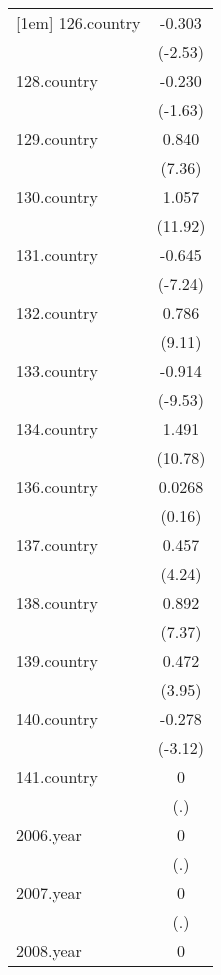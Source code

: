 {\begin{tabular}{l*{1}{c}}
[1em]
126.country &      -0.303\sym{*}  \\
            &     (-2.53)         \\
[1em]
128.country &      -0.230         \\
            &     (-1.63)         \\
[1em]
129.country &       0.840\sym{***}\\
            &      (7.36)         \\
[1em]
130.country &       1.057\sym{***}\\
            &     (11.92)         \\
[1em]
131.country &      -0.645\sym{***}\\
            &     (-7.24)         \\
[1em]
132.country &       0.786\sym{***}\\
            &      (9.11)         \\
[1em]
133.country &      -0.914\sym{***}\\
            &     (-9.53)         \\
[1em]
134.country &       1.491\sym{***}\\
            &     (10.78)         \\
[1em]
136.country &      0.0268         \\
            &      (0.16)         \\
[1em]
137.country &       0.457\sym{***}\\
            &      (4.24)         \\
[1em]
138.country &       0.892\sym{***}\\
            &      (7.37)         \\
[1em]
139.country &       0.472\sym{***}\\
            &      (3.95)         \\
[1em]
140.country &      -0.278\sym{**} \\
            &     (-3.12)         \\
[1em]
141.country &           0         \\
            &         (.)         \\
[1em]
2006.year   &           0         \\
            &         (.)         \\
[1em]
2007.year   &           0         \\
            &         (.)         \\
[1em]
2008.year   &           0         \\

\end{tabular}}
